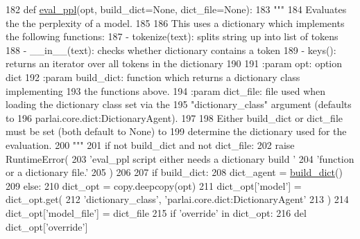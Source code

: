 \begin{DoxyCode}
182 \textcolor{keyword}{def }\hyperlink{namespaceprojects_1_1convai2_1_1eval__ppl_a417da48148c825ed1f5d6897cef06819}{eval\_ppl}(opt, build\_dict=None, dict\_file=None):
183     \textcolor{stringliteral}{"""}
184 \textcolor{stringliteral}{    Evaluates the the perplexity of a model.}
185 \textcolor{stringliteral}{}
186 \textcolor{stringliteral}{    This uses a dictionary which implements the following functions:}
187 \textcolor{stringliteral}{    - tokenize(text): splits string up into list of tokens}
188 \textcolor{stringliteral}{    - \_\_in\_\_(text): checks whether dictionary contains a token}
189 \textcolor{stringliteral}{    - keys(): returns an iterator over all tokens in the dictionary}
190 \textcolor{stringliteral}{}
191 \textcolor{stringliteral}{    :param opt: option dict}
192 \textcolor{stringliteral}{    :param build\_dict: function which returns a dictionary class implementing}
193 \textcolor{stringliteral}{        the functions above.}
194 \textcolor{stringliteral}{    :param dict\_file: file used when loading the dictionary class set via the}
195 \textcolor{stringliteral}{        "dictionary\_class" argument (defaults to}
196 \textcolor{stringliteral}{        parlai.core.dict:DictionaryAgent).}
197 \textcolor{stringliteral}{}
198 \textcolor{stringliteral}{    Either build\_dict or dict\_file must be set (both default to None) to}
199 \textcolor{stringliteral}{    determine the dictionary used for the evaluation.}
200 \textcolor{stringliteral}{    """}
201     \textcolor{keywordflow}{if} \textcolor{keywordflow}{not} build\_dict \textcolor{keywordflow}{and} \textcolor{keywordflow}{not} dict\_file:
202         \textcolor{keywordflow}{raise} RuntimeError(
203             \textcolor{stringliteral}{'eval\_ppl script either needs a dictionary build '}
204             \textcolor{stringliteral}{'function or a dictionary file.'}
205         )
206 
207     \textcolor{keywordflow}{if} build\_dict:
208         dict\_agent = \hyperlink{namespacebuild__dict}{build\_dict}()
209     \textcolor{keywordflow}{else}:
210         dict\_opt = copy.deepcopy(opt)
211         dict\_opt[\textcolor{stringliteral}{'model'}] = dict\_opt.get(
212             \textcolor{stringliteral}{'dictionary\_class'}, \textcolor{stringliteral}{'parlai.core.dict:DictionaryAgent'}
213         )
214         dict\_opt[\textcolor{stringliteral}{'model\_file'}] = dict\_file
215         \textcolor{keywordflow}{if} \textcolor{stringliteral}{'override'} \textcolor{keywordflow}{in} dict\_opt:
216             del dict\_opt[\textcolor{stringliteral}{'override'}]

\end{DoxyCode}
